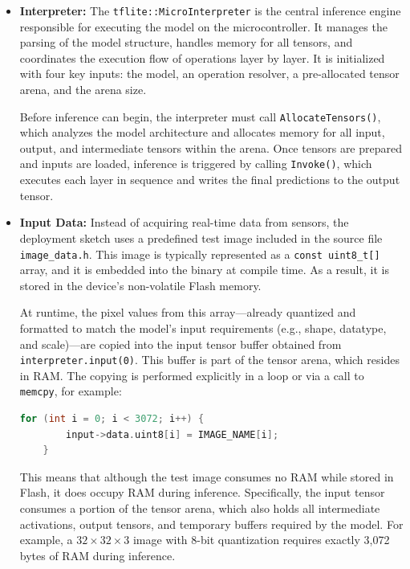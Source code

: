 \begin{itemize}
    \item \textbf{Interpreter:} 
    The \texttt{tflite::MicroInterpreter} is the central inference engine responsible for executing the model on the microcontroller. It manages the parsing of the model structure, handles memory for all tensors, and coordinates the execution flow of operations layer by layer. It is initialized with four key inputs: the model, an operation resolver, a pre-allocated tensor arena, and the arena size.
    
    Before inference can begin, the interpreter must call \texttt{AllocateTensors()}, which analyzes the model architecture and allocates memory for all input, output, and intermediate tensors within the arena. Once tensors are prepared and inputs are loaded, inference is triggered by calling \texttt{Invoke()}, which executes each layer in sequence and writes the final predictions to the output tensor.
    

    \item \textbf{Input Data:} 
    Instead of acquiring real-time data from sensors, the deployment sketch uses a predefined test image included in the source file \texttt{image\_data.h}. This image is typically represented as a \texttt{const uint8\_t[]} array, and it is embedded into the binary at compile time. As a result, it is stored in the device’s non-volatile Flash memory.
    
    At runtime, the pixel values from this array—already quantized and formatted to match the model’s input requirements (e.g., shape, datatype, and scale)—are copied into the input tensor buffer obtained from \texttt{interpreter.input(0)}. This buffer is part of the tensor arena, which resides in RAM. The copying is performed explicitly in a loop or via a call to \texttt{memcpy}, for example:
    
    \begin{lstlisting}[language=C, caption={Copying input image data from Flash to RAM input tensor}, label=lst:copy_input_tensor]
    for (int i = 0; i < 3072; i++) {
        input->data.uint8[i] = IMAGE_NAME[i];
    }
    \end{lstlisting}

    
    This means that although the test image consumes no RAM while stored in Flash, it does occupy RAM during inference. Specifically, the input tensor consumes a portion of the tensor arena, which also holds all intermediate activations, output tensors, and temporary buffers required by the model. For example, a \(32 \times 32 \times 3\) image with 8-bit quantization requires exactly 3,072 bytes of RAM during inference.
    

\end{itemize}
